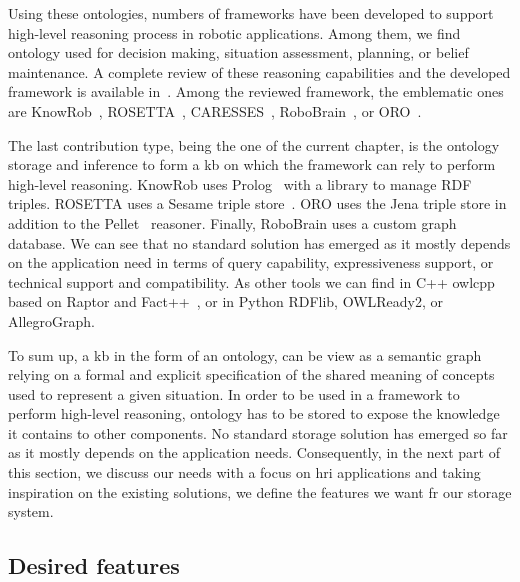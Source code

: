 Using these ontologies, numbers of frameworks have been developed to support high-level reasoning process in robotic applications. Among them, we find ontology used for decision making, situation assessment, planning, or belief maintenance. A complete review of these reasoning capabilities and the developed framework is available in~\cite{olivares_2019_review}. Among the reviewed framework, the emblematic ones are KnowRob~\cite{tenorth_2013_knowrob}, ROSETTA~\cite{stenmark_2013_knowledge}, CARESSES~\cite{bruno_2017_caresses}, RoboBrain~\cite{saxena_2014_robobrain}, or ORO~\cite{lemaignan_2010_oro}.

The last contribution type, being the one of the current chapter, is the ontology storage and inference to form a \acrlong{kb} on which the framework can rely to perform high-level reasoning. KnowRob uses Prolog~\cite{wielemaker_2003_prolog} with a library to manage RDF triples. ROSETTA uses a Sesame triple store~\cite{broekstra_2002_sesame}. ORO uses the Jena triple store in addition to the Pellet~\cite{sirin_2007_pellet} reasoner. Finally, RoboBrain uses a custom graph database. We can see that no standard solution has emerged as it mostly depends on the application need in terms of query capability, expressiveness support, or technical support and compatibility. As other tools we can find in C++ owlcpp~\cite{levin_2011_owl} based on Raptor and Fact++~\cite{tsarkov_2006_fact}, or in Python RDFlib, OWLReady2, or AllegroGraph.

To sum up, a \acrlong{kb} in the form of an ontology, can be view as a semantic graph relying on a formal and explicit specification of the shared meaning of concepts used to represent a given situation. In order to be used in a framework to perform high-level reasoning, ontology has to be stored to expose the knowledge it contains to other components. No standard storage solution has emerged so far as it mostly depends on the application needs. Consequently, in the next part of this section, we discuss our needs with a focus on \acrlong{hri} applications and taking inspiration on the existing solutions, we define the features we want fr our storage system.


\subsection{Desired features}

